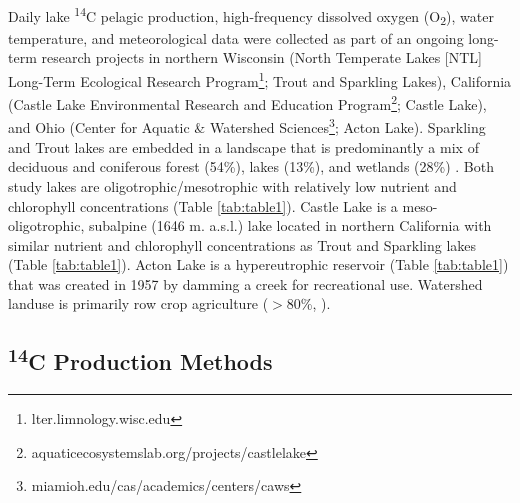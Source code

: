 \documentclass[12pt, oneside]{article}
\begin{document}
Daily lake \textsuperscript{14}C pelagic production, high-frequency dissolved oxygen (O\textsubscript{2}), water temperature, and meteorological data were collected as part of an ongoing long-term research projects in northern Wisconsin (North Temperate Lakes [NTL] Long-Term Ecological Research Program\footnote{lter.limnology.wisc.edu}; Trout and Sparkling Lakes), California (Castle Lake Environmental Research and Education Program\footnote{aquaticecosystemslab.org/projects/castlelake}; Castle Lake), and Ohio (Center for Aquatic \& Watershed Sciences\footnote{miamioh.edu/cas/academics/centers/caws}; Acton Lake). Sparkling and Trout lakes are embedded in a landscape that is predominantly a mix of deciduous and coniferous forest (54\%), lakes (13\%), and wetlands (28\%) \cite{magnuson_long-term_2006}. Both study lakes are oligotrophic/mesotrophic with relatively low nutrient and chlorophyll concentrations (Table \ref{tab:table1}). Castle Lake is a meso-oligotrophic, subalpine (1646 m. a.s.l.) lake \citep{VanderZanden_Chandra_Park_Vadeboncoeur_Goldman_2006} located in northern California with similar nutrient and chlorophyll concentrations as Trout and Sparkling lakes (Table \ref{tab:table1}). Acton Lake is a hypereutrophic reservoir (Table \ref{tab:table1}) that was created in 1957 by damming a creek for recreational use. Watershed landuse is primarily row crop agriculture ($>$80\%, \citealt{vanni_dissolved_2001}).

\subsection*{\textsuperscript{14}C Production Methods} %
\end{document}
